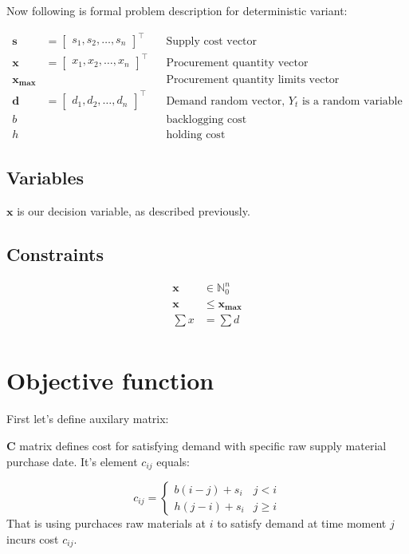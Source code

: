 Now following is formal problem description for deterministic variant:

\begin{align*}
    \mathbf{s} &= \begin{bmatrix}
        s_1, s_2, \dotsc, s_n
    \end{bmatrix}^\intercal && \text{Supply cost vector} \\
    \mathbf{x} &= \begin{bmatrix}
        x_1, x_2, \dotsc, x_n
    \end{bmatrix}^\intercal && \text{Procurement quantity vector} \\
    \mathbf{x_{\max}}  & && \text{Procurement quantity limits vector} \\
    \mathbf{d} &= \begin{bmatrix}
        d_1, d_2, \dotsc, d_n
    \end{bmatrix}^\intercal && \text{Demand random vector, $Y_t$ is a random variable} \\
    b & && \text{backlogging cost} \\
    h & && \text{holding cost}
\end{align*}

\subsection{Variables}
\label{sub:Variables}
$\mathbf{x}$ is our decision variable, as described previously.
\subsection{Constraints}
\label{sub:Constraints}
\begin{align*}
    \mathbf{x} &\in \mathbb{N}_0^n \\
    \mathbf{x} &\le \mathbf{x_{\text{max}}}\\
    \sum{x} &= \sum{d} \\
\end{align*}

\section{Objective function}

First let's define auxilary matrix:

\begin{definition}{$\mathbf{C}$}
matrix defines cost for satisfying demand with specific raw supply material purchase date. It's element $c_{ij}$ equals:

\begin{equation*}
    c_{ij} = \begin{cases}
        b \left( i - j \right) + s_i & j < i \\
        h \left( j - i \right) + s_i & j \ge i
    \end{cases}
\end{equation*}
That is using purchaces raw materials at $i$ to satisfy demand at time moment $j$ incurs cost $c_{ij}$.
\end{definition}


